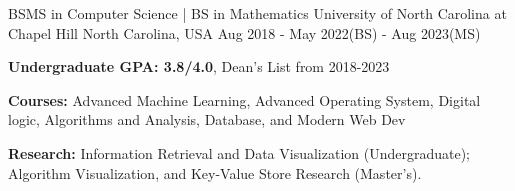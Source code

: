 

\begin{cventries}
\cventry
    {BSMS in Computer Science | BS in Mathematics} %
    {University of North Carolina at Chapel Hill} %
    {North Carolina, USA} %
    {Aug 2018 - May 2022(BS) - Aug 2023(MS)} %
    {
      \begin{cvitems} %
        \item {\textbf{Undergraduate GPA: 3.8/4.0}, Dean's List from 2018-2023}
        \item {\textbf{Courses:} Advanced Machine Learning, Advanced Operating System, Digital logic, Algorithms and Analysis, Database, and Modern Web Dev}
        \item {\textbf{Research:}  Information Retrieval and Data Visualization (Undergraduate); Algorithm Visualization, and Key-Value Store Research (Master's).}
      \end{cvitems}
    }

\end{cventries}
